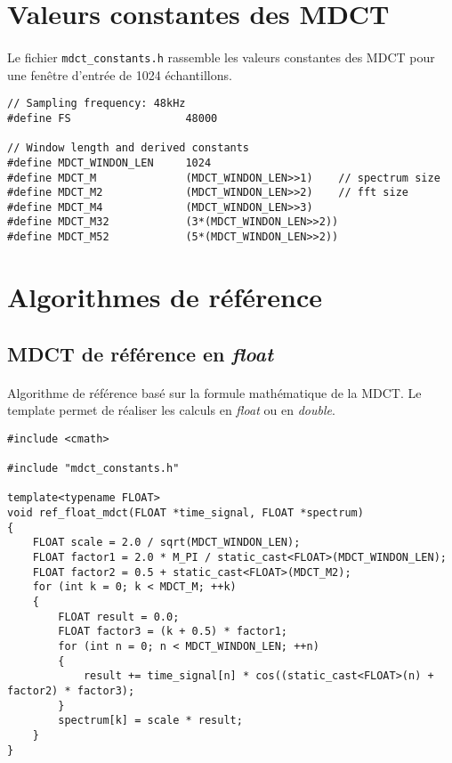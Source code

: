 \documentclass{article}
\begin{document}

\newpage
\section{Valeurs constantes des MDCT}\label{app:mdct_const}
\paragraph{}
Le fichier \texttt{mdct\_constants.h} rassemble les valeurs constantes des MDCT pour une fenêtre d'entrée de 1024 échantillons.
\lstset{language=C++}
\begin{lstlisting}
// Sampling frequency: 48kHz
#define FS                  48000

// Window length and derived constants
#define MDCT_WINDON_LEN     1024
#define MDCT_M              (MDCT_WINDON_LEN>>1)    // spectrum size
#define MDCT_M2             (MDCT_WINDON_LEN>>2)    // fft size
#define MDCT_M4             (MDCT_WINDON_LEN>>3)
#define MDCT_M32            (3*(MDCT_WINDON_LEN>>2))
#define MDCT_M52            (5*(MDCT_WINDON_LEN>>2))
\end{lstlisting}



\newpage
\section{Algorithmes de référence}\label{app:mdct_ref}
\subsection{MDCT de référence en \emph{float}}\label{app:mdct_ref_float}
\paragraph{}
Algorithme de référence basé sur la formule mathématique de la MDCT. Le template permet de réaliser les calculs en \emph{float} ou en \emph{double}.
\lstset{language=C++}
\begin{lstlisting}
#include <cmath>

#include "mdct_constants.h"

template<typename FLOAT>
void ref_float_mdct(FLOAT *time_signal, FLOAT *spectrum)
{
    FLOAT scale = 2.0 / sqrt(MDCT_WINDON_LEN);
    FLOAT factor1 = 2.0 * M_PI / static_cast<FLOAT>(MDCT_WINDON_LEN);
    FLOAT factor2 = 0.5 + static_cast<FLOAT>(MDCT_M2);
    for (int k = 0; k < MDCT_M; ++k)
    {
        FLOAT result = 0.0;
        FLOAT factor3 = (k + 0.5) * factor1;
        for (int n = 0; n < MDCT_WINDON_LEN; ++n)
        {
            result += time_signal[n] * cos((static_cast<FLOAT>(n) + factor2) * factor3);
        }
        spectrum[k] = scale * result;
    }
}
\end{lstlisting}
\end{document}
